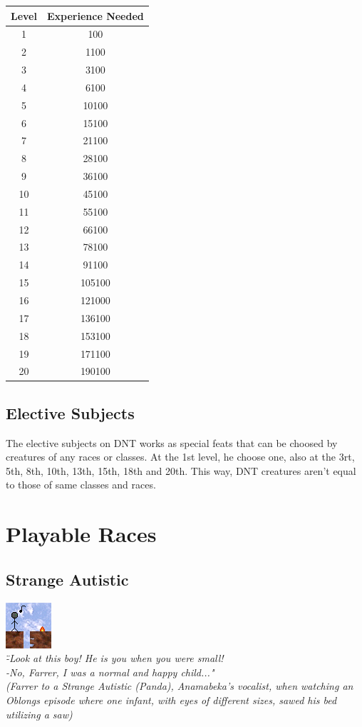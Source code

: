 \documentclass[ letterpaper,12pt]{article}
\begin{document}
\begin{center}
\begin{tabular}{|c||c|}
\hline
Level & Experience Needed\\
\hline
1 & 100\\
\hline
2 & 1100\\
\hline
3 & 3100\\
\hline
4 & 6100\\
\hline
5 & 10100\\
\hline
6 & 15100\\
\hline
7 & 21100\\
\hline
8 & 28100\\
\hline
9 & 36100\\
\hline
10 & 45100\\
\hline
11 & 55100\\
\hline
12 & 66100\\
\hline
13 & 78100\\
\hline
14 & 91100\\
\hline
15 & 105100\\
\hline
16 & 121000\\
\hline
17 & 136100\\
\hline
18 & 153100\\
\hline
19 & 171100\\
\hline
20 & 190100\\
\hline
\end{tabular}
\end{center}

\subsection{Elective Subjects}

The elective subjects on DNT works as special feats that can be choosed by
creatures  of any races or classes. At the 1st level, he choose one, also at
the 3rt, 5th, 8th, 10th, 13th, 15th, 18th and 20th. This way, DNT creatures
aren't equal to those of same classes and races.

\section{Playable Races}

\subsection{Strange Autistic}
\includegraphics{../data/races/Img/autista.png}\\
{\it \" -Look at this boy! He is you when you were small!\\
 -No, Farrer, I was a normal and happy child..."\\
(Farrer to a Strange Autistic (Panda), Anamabeka's vocalist, when watching an Oblongs episode where one infant, with eyes of different sizes, sawed his bed utilizing a saw)\\}
\end{document}
